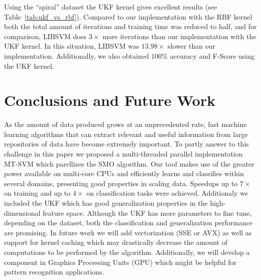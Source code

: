 \documentclass{llncs}
\begin{document}
Using the ``spiral'' dataset the UKF kernel gives excellent results (see Table~\ref{tab:ukf_vs_rbf}). Compared to our implementation with the RBF kernel both the total amount of iterations and training time was reduced to half, and for comparison, LIBSVM does $3\times$ more iterations than our implementation with the UKF kernel. In this situation, LIBSVM was $13.98\times$ slower than our implementation. Additionally, we also obtained $100\%$ accuracy and F-Score using the \ac{UKF} kernel.
\section{Conclusions and Future Work}
\label{sec:conclusions}
As the amount of data produced grows at an unprecedented rate, fast machine learning algorithms that can extract relevant and useful information from large repositories of data have become extremely important. To partly answer to this challenge 
in this paper we proposed a multi-threaded parallel implementation MT-SVM which parellizes the SMO algorithm. Our tool makes use of the greater power available on multi-core \acp{CPU} and efficiently learns and classifies within several domains, presenting good properties in scaling data. Speedups up to $7\times$ on training and up to $4\times$ on classification tasks were achieved.
Additionaly we included  the \ac{UKF} which has good generalization properties in the high-dimensional feature space. Although the UKF has more parameters to fine tune, depending on the dataset, both the classification and generalization performance are promising.
In future work we will add vectorization (SSE or AVX) as well as support for kernel caching which may drastically decrease the amount of computations to be performed by the algorithm. Additionally, we will develop a component in Graphics Processing Units (GPU) which might be helpful for pattern recognition applications.








\end{document}
